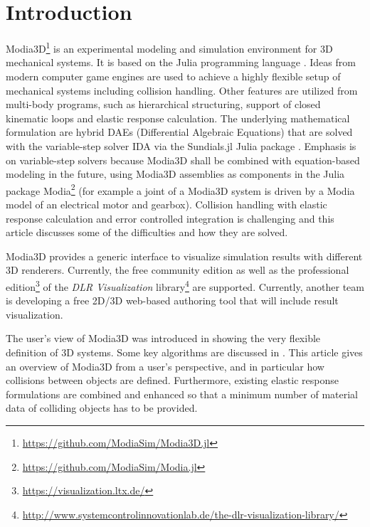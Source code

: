 \section{Introduction}

Modia3D\footnote{\href{https://github.com/ModiaSim/Modia3D.jl}{https://github.com/ModiaSim/Modia3D.jl}} is an experimental modeling and simulation environment for 3D mechanical systems. It is based on the Julia programming language \cite{bezanson2017julia}.
Ideas from modern computer game engines are used to achieve a highly flexible setup of mechanical
systems including collision handling. Other features are utilized from multi-body programs, 
such as hierarchical structuring, support of closed kinematic loops and elastic response calculation.
The underlying mathematical formulation are hybrid DAEs (Differential Algebraic Equations) that are solved with the variable-step solver IDA via the Sundials.jl Julia package \cite{Sundials2005,Rackauckas2017}.
Emphasis is on variable-step solvers because Modia3D shall be combined with 
equation-based modeling in the future, using Modia3D assemblies as components in the Julia package
Modia\footnote{\href{https://github.com/ModiaSim/Modia.jl}{https://github.com/ModiaSim/Modia.jl}} \cite{Modia1,Modia2}
(for example a joint of a Modia3D system is driven by a Modia model of an 
electrical motor and gearbox).
Collision handling with elastic response calculation and error controlled integration
is challenging and this article discusses some of the difficulties and how they are solved.

Modia3D provides a generic interface to visualize simulation results with different 3D renderers. Currently, the free community edition as well as the professional edition\footnote{\href{https://visualization.ltx.de/}{https://visualization.ltx.de/}} of the
\emph{DLR Visualization}  library\footnote{\href{http://www.systemcontrolinnovationlab.de/the-dlr-visualization-library/}{http://www.systemcontrolinnovationlab.de/the-dlr-visualization-library/}} \cite{bellmann2009, hellerer2014} are supported. Currently, another team is developing a free 2D/3D web-based authoring tool that will include result visualization.

The user's view of Modia3D was introduced in \cite{Neumayr2018} showing the very flexible definition of 3D systems.
Some key algorithms are discussed in \cite{Neumayr2017,Neumayr2019}. This article gives an overview of Modia3D from a user's perspective, and in particular how collisions between objects are defined. Furthermore, existing elastic response formulations are combined and enhanced so that a minimum number of material data of colliding objects has to be provided.
